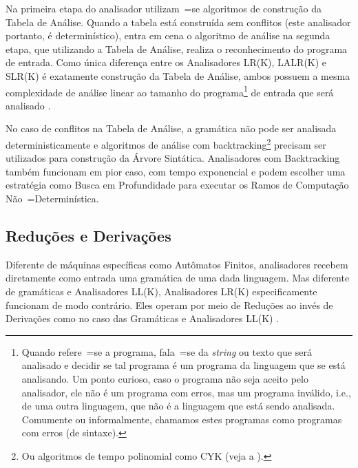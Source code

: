 Na primeira etapa do analisador utilizam~=se algoritmos de construção da Tabela de Análise.
Quando a tabela está construída sem conflitos (este analisador portanto,
é determinístico),
entra em cena o algoritmo de análise na segunda etapa,
que utilizando a Tabela de Análise,
realiza o reconhecimento do programa de entrada.
Como única diferença entre os Analisadores LR(K),
LALR(K) e
SLR(K) é exatamente construção da Tabela de Análise,
ambos possuem a mesma complexidade de análise linear ao tamanho do programa\footnote{
Quando refere~=se a programa,
fala~=se da \textit{string} ou
texto que será analisado e
decidir se tal programa é um programa da linguagem que se está analisando.
Um ponto curioso,
caso o programa não seja aceito pelo analisador,
ele não é um programa com erros,
mas um programa inválido,
i.e.,
de uma outra linguagem,
que não é a linguagem que está sendo analisada.
Comumente ou
informalmente,
chamamos estes programas como programas com erros (de sintaxe).
}
de entrada que será analisado \cite{knuthLrParser1965,linearLL1AndLR1Grammars,generalContextFreeParsingAlgorithm}.

No caso de conflitos na Tabela de Análise,
a gramática não pode ser analisada deterministicamente e
algoritmos de análise com backtracking\footnote{
Ou algoritmos de tempo polinomial como CYK (veja a ).
}
precisam ser utilizados para construção da Árvore Sintática.
%
Analisadores com Backtracking também funcionam em pior caso,
com tempo exponencial e
podem escolher uma estratégia como Busca em Profundidade \cite{cormenIntroductionToAlgorithms} para executar os Ramos de Computação Não~=Determinística.


\subsection{Reduções e Derivações}
\label{reducoesEderivacoes}

Diferente de máquinas específicas como Autômatos Finitos,
analisadores recebem diretamente como entrada uma gramática de uma dada linguagem.
Mas diferente de gramáticas e
Analisadores LL(K),
Analisadores LR(K) especificamente funcionam de modo contrário.
Eles operam por meio de Reduções ao invés de Derivações como no caso das Gramáticas e
Analisadores LL(K) \cite{ahoCompilerDragonBook}.

